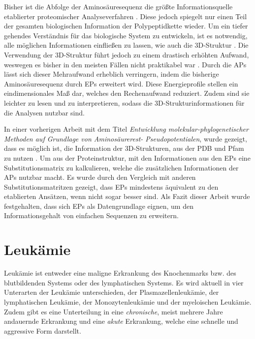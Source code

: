 Bisher ist die Abfolge der Aminosäuresequenz die größte Informationsquelle etablierter proteomischer Analyseverfahren \cite{Landels.2015}. Diese jedoch spiegelt nur einen Teil der gesamten biologischen Information der Polypeptidkette wieder. Um ein tiefer gehendes Verständnis für das biologische System zu entwickeln, ist es notwendig, alle möglichen Informationen einfließen zu lassen, wie auch die 3D-Struktur \cite{Nagae.2012}. Die Verwendung der 3D-Struktur führt jedoch zu einem drastisch erhöhten Aufwand, weswegen es bisher in den meisten Fällen nicht praktikabel war \cite{Capriotti.2013}. Durch die \ac{APs} lässt sich dieser Mehraufwand erheblich verringern, indem die bisherige Aminosäuresequenz durch \ac{EP}s erweitert wird. Diese Energieprofile stellen ein eindimensionales Maß dar, welches den Rechenaufwand reduziert. Zudem sind sie leichter zu lesen und zu interpretieren, sodass die 3D-Strukturinformationen für die Analysen nutzbar sind.

In einer vorherigen Arbeit mit dem Titel \emph{Entwicklung mole\-kular-phylo\-genetisch\-er Methoden auf Grundlage von Aminosäurerest- Pseudopotentialen}, wurde gezeigt, dass es möglich ist, die Information der 3D-Strukturen, aus der \ac{PDB} und \ac{Pfam} zu nutzen \cite{Mathias.2014}. Um aus der Proteinstruktur, mit den Informationen aus den \ac{EP}s eine Substitutionsmatrix zu kalkulieren, welche die zusätzlichen Informationen der \ac{APs} nutzbar macht. Es wurde durch den Vergleich mit anderen Substitutionsmatritzen gezeigt, dass \ac{EP}s mindestens äquivalent zu den etablierten Ansätzen, wenn nicht sogar besser sind. Als Fazit dieser Arbeit wurde festgehalten, dass sich \ac{EP}s als Datengrundlage eignen, um den Informationsgehalt von einfachen Sequenzen zu erweitern.



\section{Leukämie}
\label{sec:leuk}
Leukämie ist entweder eine maligne Erkrankung des Knochenmarks bzw. des blutbildenden Systems oder des lymphatischen Systems. Es wird aktuell in vier Unterarten der Leukämie unterschieden, der Plasmazellenleukämie, der lymphatischen Leukämie, der Monozytenleukämie und der myeloischen Leukämie. Zudem gibt es eine Unterteilung in eine \emph{chronische}, meist mehrere Jahre andauernde Erkrankung und eine \emph{akute} Erkrankung, welche eine schnelle und aggressive Form darstellt.

